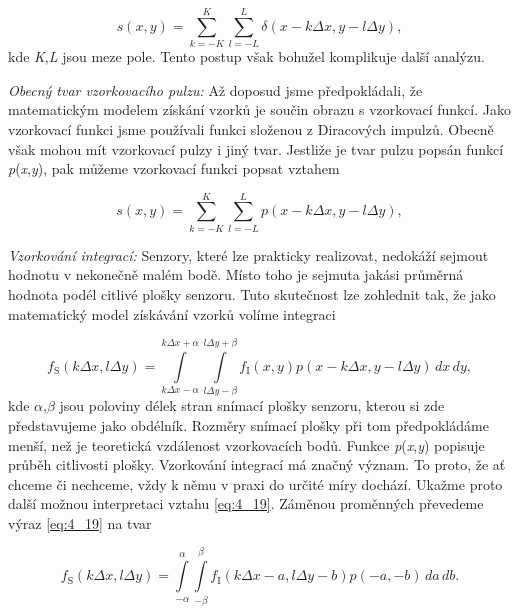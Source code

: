 \begin{equation} \label{eq:4_17}
    s(x, y) = \sum\limits_{k=-K}^{K} \sum\limits_{l=-L}^{L} \delta(x - k\Delta x, y - l\Delta y),
\end{equation}
kde \textit{K},\textit{L} jsou meze pole. Tento postup však bohužel komplikuje další analýzu.

\noindent \textit{Obecný tvar vzorkovacího pulzu:} Až doposud jsme předpokládali, že matematickým modelem získání vzorků je součin obrazu s vzorkovací funkcí. Jako vzorkovací funkci jsme používali funkci složenou z Diracových impulzů. Obecně však mohou mít vzorkovací pulzy i jiný tvar. Jestliže je tvar pulzu popsán funkcí \textit{p}(\textit{x},\textit{y}), pak můžeme vzorkovací funkci popsat vztahem

\begin{equation} \label{eq:4_18}
    s(x, y) = \sum\limits_{k=-K}^{K} \sum\limits_{l=-L}^{L} p(x - k\Delta x, y - l\Delta y),
\end{equation}

\noindent \textit{Vzorkování integrací:} Senzory, které lze prakticky realizovat, nedokáží sejmout hodnotu v nekonečně malém bodě. Místo toho je sejmuta jakási průměrná hodnota podél citlivé plošky senzoru. Tuto skutečnost lze zohlednit tak, že jako matematický model získávání vzorků volíme integraci

\begin{equation} \label{eq:4_19}
    f_\mathrm{S}(k\Delta x, l\Delta y) = \int\limits_{k\Delta x - \alpha}^{k\Delta x + \alpha} \int\limits_{l\Delta y - \beta}^{l\Delta y + \beta} f_\mathrm{I}(x, y) p( x - k\Delta x, y - l\Delta y)\,dx\,dy,
\end{equation}
kde $\alpha$,$\beta$ jsou poloviny délek stran snímací plošky senzoru, kterou si zde představujeme jako obdélník. Rozměry snímací plošky při tom předpokládáme menší, než je teoretická vzdálenost vzorkovacích bodů. Funkce \textit{p}(\textit{x},\textit{y}) popisuje průběh citlivosti plošky. Vzorkování integrací má značný význam. To proto, že ať chceme či nechceme, vždy k němu v praxi do určité míry dochází. Ukažme proto další možnou interpretaci vztahu \eqref{eq:4_19}. Záměnou proměnných převedeme výraz \eqref{eq:4_19} na tvar

\begin{equation} \label{eq:4_20}
    f_\mathrm{S}(k\Delta x, l\Delta y) = \int\limits_{- \alpha}^{\alpha} \int\limits_{- \beta}^{\beta} f_\mathrm{I}(k\Delta x - a, l\Delta y - b)p(-a, -b)\,da\,db.
\end{equation}

